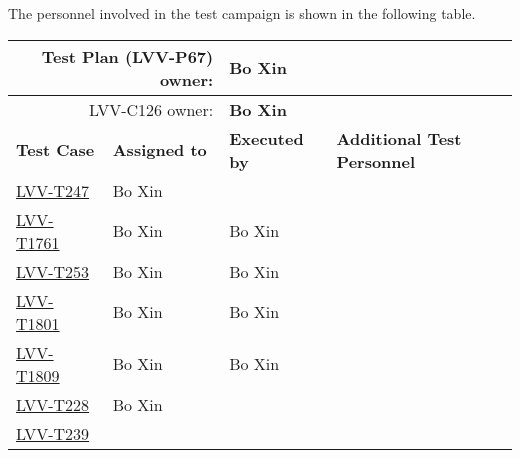 \documentclass[SE,lsstdraft,STR,toc]{lsstdoc}
\begin{document}
The personnel involved in the test campaign is shown in the following table.

\begin{longtable}{p{3cm}p{3cm}p{3cm}p{6cm}}
\hline
\multicolumn{2}{r}{Test Plan (LVV-P67) owner:} &
\multicolumn{2}{l}{\textbf{ Bo Xin } }\\\hline
\multicolumn{2}{r}{ LVV-C126 owner:} &
\multicolumn{2}{l}{\textbf{
    Bo Xin
}
} \\\hline
\textbf{Test Case} & \textbf{Assigned to} & \textbf{Executed by} & \textbf{Additional Test Personnel} \\ \hline
\href{https://jira.lsstcorp.org/secure/Tests.jspa#/testCase/LVV-T247}{LVV-T247}
& {\small Bo Xin } & {\small  } &
\begin{minipage}[]{6cm}
\smallskip
{\small  }
\medskip
\end{minipage}
\\ \hline
\href{https://jira.lsstcorp.org/secure/Tests.jspa#/testCase/LVV-T1761}{LVV-T1761}
& {\small Bo Xin } & {\small Bo Xin } &
\begin{minipage}[]{6cm}
\smallskip
{\small  }
\medskip
\end{minipage}
\\ \hline
\href{https://jira.lsstcorp.org/secure/Tests.jspa#/testCase/LVV-T253}{LVV-T253}
& {\small Bo Xin } & {\small Bo Xin } &
\begin{minipage}[]{6cm}
\smallskip
{\small  }
\medskip
\end{minipage}
\\ \hline
\href{https://jira.lsstcorp.org/secure/Tests.jspa#/testCase/LVV-T1801}{LVV-T1801}
& {\small Bo Xin } & {\small Bo Xin } &
\begin{minipage}[]{6cm}
\smallskip
{\small  }
\medskip
\end{minipage}
\\ \hline
\href{https://jira.lsstcorp.org/secure/Tests.jspa#/testCase/LVV-T1809}{LVV-T1809}
& {\small Bo Xin } & {\small Bo Xin } &
\begin{minipage}[]{6cm}
\smallskip
{\small  }
\medskip
\end{minipage}
\\ \hline
\href{https://jira.lsstcorp.org/secure/Tests.jspa#/testCase/LVV-T228}{LVV-T228}
& {\small Bo Xin } & {\small  } &
\begin{minipage}[]{6cm}
\smallskip
{\small  }
\medskip
\end{minipage}
\\ \hline
\href{https://jira.lsstcorp.org/secure/Tests.jspa#/testCase/LVV-T239}{LVV-T239}

\end{longtable}
\end{document}
